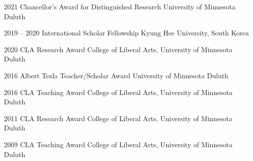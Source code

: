 \newpage
{}
\begin{cvskills}


    \cvskill
    {2021} %
    {Chancellor’s Award for Distinguished Research} %
    {University of Minnesota Duluth} %
    

  \cvskill
    {2019 – 2020} %
    {International Scholar Fellowship} %
    {Kyung Hee University, South Korea} %

    \cvskill
    {2020} %
    {CLA Research Award} %
    { College of Liberal Arts, University of Minnesota Duluth} %
    

    \cvskill
    {2016} %
    {Albert Tezla Teacher/Scholar Award} %
    {University of Minnesota Duluth} %

    \cvskill
    {2016} %
    {CLA Teaching Award} %
    {College of Liberal Arts, University of Minnesota Duluth} %

    \cvskill
    {2011} %
    {CLA Research Award} %
    {College of Liberal Arts, University of Minnesota Duluth} %


    \cvskill
    {2009} %
    {CLA Teaching Award} %
    {College of Liberal Arts, University of Minnesota Duluth} %
    

\end{cvskills}

